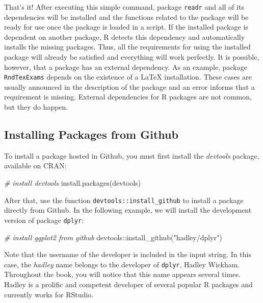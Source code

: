 \documentclass[
  12pt,
]{book}
\newenvironment{Shaded}{\begin{snugshade}}{\end{snugshade}}
\newcommand{\CommentTok}[1]{\textcolor[rgb]{0.37,0.37,0.37}{\textit{#1}}}
\newcommand{\FunctionTok}[1]{\textcolor[rgb]{0,0,0}{#1}}
\newcommand{\NormalTok}[1]{#1}
\newcommand{\SpecialCharTok}[1]{\textcolor[rgb]{0,0,0}{#1}}
\newcommand{\StringTok}[1]{\textcolor[rgb]{0.5,0.5,0.5}{#1}}
\begin{document}
That's it! After executing this simple command, package \texttt{readr} and all of its dependencies will be installed and the functions related to the package will be ready for use once the package is loaded in a script. If the installed package is dependent on another package, R detects this dependency and automatically installs the missing packages. Thus, all the requirements for using the installed package will already be satisfied and everything will work perfectly. It is possible, however, that a package has an external dependency. As an example, package \texttt{RndTexExams} depends on the existence of a LaTeX installation. These cases are usually announced in the description of the package and an error informs that a requirement is missing. External dependencies for R packages are not common, but they do happen.

\hypertarget{installing-packages-from-github}{%
\subsection{Installing Packages from Github}\label{installing-packages-from-github}}

To install a package hosted in Github, you must first install the \emph{devtools} package, available on CRAN: 

\begin{Shaded}
\begin{Highlighting}[]
\CommentTok{\# install devtools}
\FunctionTok{install.packages}\NormalTok{(}\StringTok{\textquotesingle{}devtools\textquotesingle{}}\NormalTok{)}
\end{Highlighting}
\end{Shaded}

After that, use the function \texttt{devtools::install\_github} to install a package directly from Github. In the following example, we will install the development version of package \texttt{dplyr}: 

\begin{Shaded}
\begin{Highlighting}[]
\CommentTok{\# install ggplot2 from github}
\NormalTok{devtools}\SpecialCharTok{::}\FunctionTok{install\_github}\NormalTok{(}\StringTok{"hadley/dplyr"}\NormalTok{)}
\end{Highlighting}
\end{Shaded}

Note that the username of the developer is included in the input string. In this case, the \emph{hadley} name belongs to the developer of \texttt{dplyr}, Hadley Wickham. Throughout the book, you will notice that this name appears several times. Hadley is a prolific and competent developer of several popular R packages and currently works for RStudio.
\end{document}
